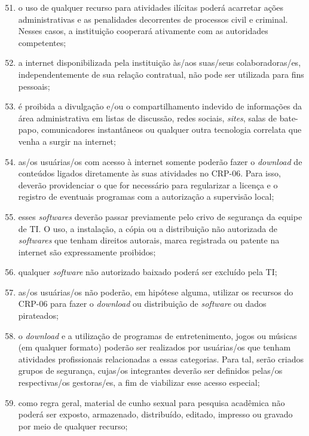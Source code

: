 \documentclass[openright, twoside, a4paper]{memoir}
\begin{document}
\begin{enumerate}

\setcounter{enumi}{50}
\item
    o uso de qualquer recurso para atividades ilícitas poderá acarretar
    ações administrativas e as penalidades decorrentes de processos civil
    e criminal. Nesses casos, a instituição cooperará ativamente com as
    autoridades competentes;
\item
    a internet disponibilizada pela instituição às/aos suas/seus
    colaboradoras/es, independentemente de sua relação contratual, não
    pode ser utilizada para fins pessoais;
\item
    é proibida a divulgação e/ou o compartilhamento indevido de
    informações da área administrativa em listas de discussão, redes
    sociais, \emph{sites}, salas de bate-papo, comunicadores instantâneos
    ou qualquer outra tecnologia correlata que venha a surgir na internet;
\item
    as/os usuárias/os com acesso à internet somente poderão fazer o
    \emph{download} de conteúdos ligados diretamente às suas atividades no
    CRP-06. Para isso, deverão providenciar o que for necessário para
    regularizar a licença e o registro de eventuais programas com a
    autorização a supervisão local;
\item
    esses \emph{softwares} deverão passar previamente pelo crivo de
    segurança da equipe de TI. O uso, a instalação, a cópia ou a
    distribuição não autorizada de \emph{softwares} que tenham direitos
    autorais, marca registrada ou patente na internet são expressamente
    proibidos;
\item
    qualquer \emph{software} não autorizado baixado poderá ser excluído
    pela TI;
\item
    as/os usuárias/os não poderão, em hipótese alguma, utilizar os
    recursos do CRP-06 para fazer o \emph{download} ou distribuição
    de \emph{software} ou dados pirateados;
\item
    o \emph{download} e a utilização de programas de entretenimento, jogos
    ou músicas (em qualquer formato) poderão ser realizados por
    usuárias/os que tenham atividades profissionais relacionadas a essas
    categorias. Para tal, serão criados grupos de segurança, cujas/os
    integrantes deverão ser definidos pelas/os respectivas/os gestoras/es,
    a fim de viabilizar esse acesso especial;
\item
    como regra geral, material de cunho sexual para pesquisa acadêmica não
    poderá ser exposto, armazenado, distribuído, editado, impresso ou
    gravado por meio de qualquer recurso;
\end{enumerate}
\end{document}
